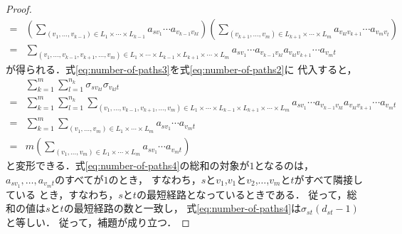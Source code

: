\begin{proof}
\begin{align}
    =&\left(\sum_{(v_1,\ldots,v_{k-1})\in L_1\times\cdots\times L_{k-1}}
    a_{sv_1}\cdots a_{v_{k-1}v_{kl}}\right)
    \left(\sum_{(v_{k+1},\ldots,v_m)\in L_{k+1}\times\cdots\times L_m}
    a_{v_{kl}v_{k+1}}\cdots a_{v_mv_t}\right)\nonumber\\
    =&\sum_{(v_1,\ldots,v_{k-1},v_{k+1},\ldots,v_m)\in L_1\times\cdots\times L_{k-1}\times L_{k+1}\times\cdots\times L_m}
    a_{sv_1}\cdots a_{v_{k-1}v_{kl}}a_{v_{kl}v_{k+1}}\cdots a_{v_mt}
    \label{eq:number-of-paths3}
  \end{align}
  が得られる．式\ref{eq:number-of-paths3}を式\ref{eq:number-of-paths2}に
  代入すると，
  \begin{align}
    &\sum_{k=1}^m\sum_{l=1}^{n_k}\sigma_{sv_{kl}}\sigma_{v_{kl}t}\nonumber\\
    =&\sum_{k=1}^m\sum_{l=1}^{n_k}\sum_{
      (v_1,\ldots,v_{k-1},v_{k+1},\ldots,v_m)\in
      L_1\times\cdots\times L_{k-1}\times L_{k+1}\times\cdots\times L_m
    }a_{sv_1}\cdots a_{v_{k-1}v_{kl}}a_{v_{kl}v_{k+1}}\cdots a_{v_mt}\nonumber\\
    =&\sum_{k=1}^m\sum_{(v_1,\ldots,v_m)\in L_1\times\cdots\times L_m}
    a_{sv_1}\cdots a_{v_mt}\nonumber\\
    =&m\left(\sum_{(v_1,\ldots,v_m)\in L_1\times\cdots\times L_m}
    a_{sv_1}\cdots a_{v_mt}\right)
    \label{eq:number-of-paths4}
  \end{align}
  と変形できる．式\ref{eq:number-of-paths4}の総和の対象が$1$となるのは，
  $a_{sv_1},\ldots,a_{v_mt}$のすべてが$1$のとき，
  すなわち，$s$と$v_1$,$v_1$と$v_2$,$\ldots$,$v_m$と$t$がすべて隣接している
  とき，すなわち，$s$と$t$の最短経路となっているときである．
  従って，総和の値は$s$と$t$の最短経路の数と一致し，
  式\ref{eq:number-of-paths4}は$\sigma_{st}(d_{st}-1)$と等しい．
  従って，補題が成り立つ．
\end{proof}

